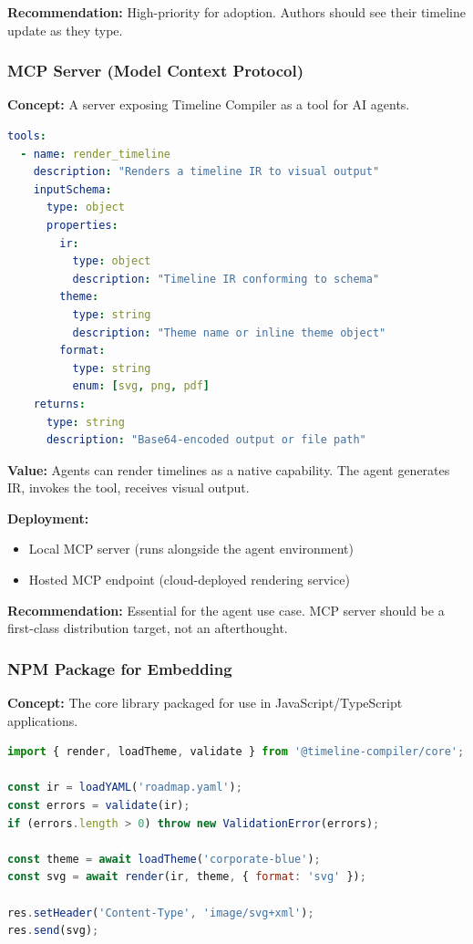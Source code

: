 \textbf{Recommendation:} High-priority for adoption. Authors should see their timeline update as they type.

\subsubsection{MCP Server (Model Context Protocol)}

\textbf{Concept:} A server exposing Timeline Compiler as a tool for AI agents.

\begin{lstlisting}[language=yaml,caption={MCP tool definition (conceptual)}]
tools:
  - name: render_timeline
    description: "Renders a timeline IR to visual output"
    inputSchema:
      type: object
      properties:
        ir:
          type: object
          description: "Timeline IR conforming to schema"
        theme:
          type: string
          description: "Theme name or inline theme object"
        format:
          type: string
          enum: [svg, png, pdf]
    returns:
      type: string
      description: "Base64-encoded output or file path"
\end{lstlisting}

\textbf{Value:} Agents can render timelines as a native capability. The agent generates IR, invokes the tool, receives visual output.

\textbf{Deployment:} 
\begin{itemize}
  \item Local MCP server (runs alongside the agent environment)
  \item Hosted MCP endpoint (cloud-deployed rendering service)
\end{itemize}

\textbf{Recommendation:} Essential for the agent use case. MCP server should be a first-class distribution target, not an afterthought.

\subsubsection{NPM Package for Embedding}

\textbf{Concept:} The core library packaged for use in JavaScript/TypeScript applications.

\begin{lstlisting}[language=javascript,caption={Embedding in a Node.js application}]
import { render, loadTheme, validate } from '@timeline-compiler/core';

const ir = loadYAML('roadmap.yaml');
const errors = validate(ir);
if (errors.length > 0) throw new ValidationError(errors);

const theme = await loadTheme('corporate-blue');
const svg = await render(ir, theme, { format: 'svg' });

res.setHeader('Content-Type', 'image/svg+xml');
res.send(svg);
\end{lstlisting}

